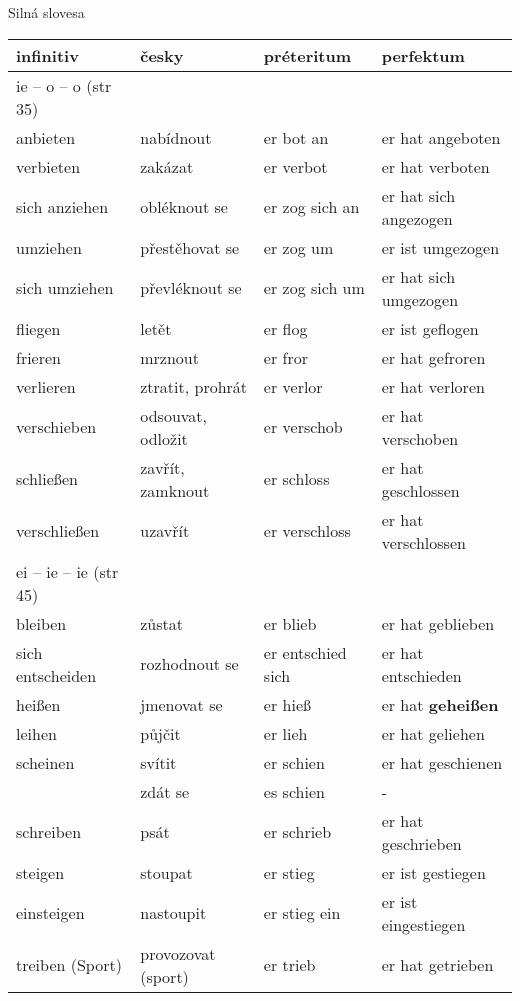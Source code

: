 \documentclass{article}
\begin{document}
Silná slovesa

\bigskip
\begin{tabular}{ p{3cm}|p{3cm}|p{3cm}|p{4cm}  }
    infinitiv & česky & préteritum & perfektum \\
    \hline
    ie -- o -- o (str 35) \\
    \hline
    anbieten & nabídnout & er bot an & er hat angeboten  \\
    verbieten & zakázat & er verbot & er hat verboten \\
    sich anziehen & obléknout se & er zog sich an & er hat sich angezogen \\
    umziehen & přestěhovat se & er zog um & er ist umgezogen \\
    sich umziehen & převléknout se & er zog sich um & er hat sich umgezogen \\
    fliegen & letět & er flog & er ist geflogen \\
    frieren & mrznout & er fror & er hat gefroren \\
    verlieren & ztratit, prohrát & er verlor & er hat verloren \\
    verschieben & odsouvat, odložit & er verschob & er hat verschoben \\
    schlie{\ss}en & zavřít, zamknout & er schloss & er hat geschlossen \\
    verschlie{\ss}en & uzavřít & er verschloss & er hat verschlossen \\
    \hline
    ei -- ie -- ie (str 45) \\
    \hline
    bleiben & zůstat & er blieb & er hat geblieben \\
    sich entscheiden & rozhodnout se & er entschied sich & er hat entschieden \\
    hei{\ss}en & jmenovat se & er hie{\ss} & er hat \textbf{gehei{\ss}en} \\
    leihen & půjčit & er lieh & er hat geliehen \\
    scheinen & svítit & er schien & er hat geschienen \\
    &zdát se & es schien & - \\
    schreiben & psát & er schrieb & er hat geschrieben \\
    steigen & stoupat & er stieg & er ist gestiegen \\
    einsteigen & nastoupit & er stieg ein & er ist eingestiegen \\
    treiben (Sport) & provozovat (sport) & er trieb & er hat getrieben \\
    \hline

\end{tabular}
\end{document}
